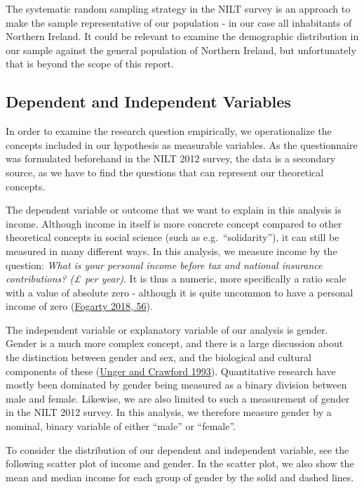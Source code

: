 \documentclass[
]{article}
\begin{document}
The systematic random sampling strategy in the NILT survey is an
approach to make the sample representative of our population - in our
case all inhabitants of Northern Ireland. It could be relevant to
examine the demographic distribution in our sample against the general
population of Northern Ireland, but unfortunately that is beyond the
scope of this report.

\hypertarget{dependent-and-independent-variables}{%
\subsection{Dependent and Independent
Variables}\label{dependent-and-independent-variables}}

In order to examine the research question empirically, we operationalize
the concepts included in our hypothesis as measurable variables. As the
questionnaire was formulated beforehand in the NILT 2012 survey, the
data is a secondary source, as we have to find the questions that can
represent our theoretical concepts.

The dependent variable or outcome that we want to explain in this
analysis is income. Although income in itself is more concrete concept
compared to other theoretical concepts in social science (such as
e.g.~``solidarity''), it can still be measured in many different ways.
In this analysis, we measure income by the question: \emph{What is your
personal income before tax and national insurance contributions? (£ per
year)}. It is thus a numeric, more specifically a ratio scale with a
value of absolute zero - although it is quite uncommon to have a
personal income of zero
(\protect\hyperlink{ref-fogarty2018quantitative}{Fogarty 2018, 56}).

The independent variable or explanatory variable of our analysis is
gender. Gender is a much more complex concept, and there is a large
discussion about the distinction between gender and sex, and the
biological and cultural components of these
(\protect\hyperlink{ref-unger1993sex}{Unger and Crawford 1993}).
Quantitative research have mostly been dominated by gender being
measured as a binary division between male and female. Likewise, we are
also limited to such a measurement of gender in the NILT 2012 survey. In
this analysis, we therefore measure gender by a nominal, binary variable
of either ``male'' or ``female''.

To consider the distribution of our dependent and independent variable,
see the following scatter plot of income and gender. In the scatter
plot, we also show the mean and median income for each group of gender
by the solid and dashed lines.
\end{document}
